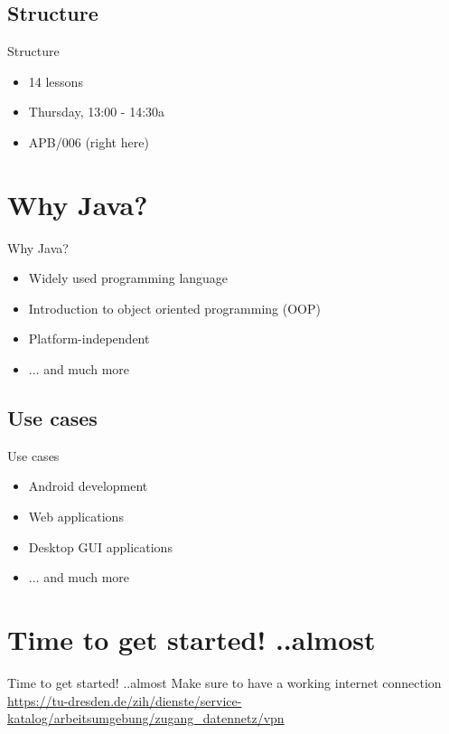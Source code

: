 \subsection{Structure}
\begin{frame}{Structure}
	\begin{itemize}
		\item 14 lessons
		\item Thursday, 13:00 - 14:30a
		\item APB/006 (right here)
	\end{itemize}
\end{frame}


\section{Why Java?}
\begin{frame}{Why Java?}
	\begin{itemize}
		\item Widely used programming language
		\item Introduction to object oriented programming (OOP)
		\item Platform-independent
		\item ... and much more
	\end{itemize}
\end{frame}

\subsection{Use cases}
\begin{frame}{Use cases}
	\begin{itemize}
		\item Android development
		\item Web applications
		\item Desktop GUI applications
		\item ... and much more
	\end{itemize}
\end{frame}



\section{Time to get started! ..almost}

\begin{frame}{Time to get started! ..almost}
	Make sure to have a working internet connection\\
	\url{https://tu-dresden.de/zih/dienste/service-katalog/arbeitsumgebung/zugang_datennetz/vpn}
\end{frame}



